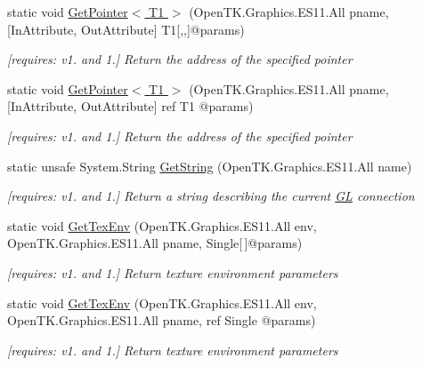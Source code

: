 \begin{DoxyCompactItemize}
static void \hyperlink{class_open_t_k_1_1_graphics_1_1_e_s11_1_1_g_l_a9da38128606214a602c546bffce73982}{Get\-Pointer$<$ T1 $>$} (Open\-T\-K.\-Graphics.\-E\-S11.\-All pname, \mbox{[}In\-Attribute, Out\-Attribute\mbox{]} T1\mbox{[},,\mbox{]}@params)
\begin{DoxyCompactList}\small\item\em \mbox{[}requires\-: v1. and 1.\mbox{]} Return the address of the specified pointer \end{DoxyCompactList}\item 
static void \hyperlink{class_open_t_k_1_1_graphics_1_1_e_s11_1_1_g_l_a3cc905378ff590fb6b6ba4b46355891b}{Get\-Pointer$<$ T1 $>$} (Open\-T\-K.\-Graphics.\-E\-S11.\-All pname, \mbox{[}In\-Attribute, Out\-Attribute\mbox{]} ref T1 @params)
\begin{DoxyCompactList}\small\item\em \mbox{[}requires\-: v1. and 1.\mbox{]} Return the address of the specified pointer \end{DoxyCompactList}\item 
static unsafe System.\-String \hyperlink{class_open_t_k_1_1_graphics_1_1_e_s11_1_1_g_l_a0abf324bb0633b3c653cf3a0b91361f6}{Get\-String} (Open\-T\-K.\-Graphics.\-E\-S11.\-All name)
\begin{DoxyCompactList}\small\item\em \mbox{[}requires\-: v1. and 1.\mbox{]} Return a string describing the current \hyperlink{class_open_t_k_1_1_graphics_1_1_e_s11_1_1_g_l}{G\-L} connection \end{DoxyCompactList}\item 
static void \hyperlink{class_open_t_k_1_1_graphics_1_1_e_s11_1_1_g_l_a9b7ddf178a46af571b1f2b7dca5b960a}{Get\-Tex\-Env} (Open\-T\-K.\-Graphics.\-E\-S11.\-All env, Open\-T\-K.\-Graphics.\-E\-S11.\-All pname, Single\mbox{[}$\,$\mbox{]}@params)
\begin{DoxyCompactList}\small\item\em \mbox{[}requires\-: v1. and 1.\mbox{]} Return texture environment parameters \end{DoxyCompactList}\item 
static void \hyperlink{class_open_t_k_1_1_graphics_1_1_e_s11_1_1_g_l_a932f46675a524ef1e1eb55748c14e83e}{Get\-Tex\-Env} (Open\-T\-K.\-Graphics.\-E\-S11.\-All env, Open\-T\-K.\-Graphics.\-E\-S11.\-All pname, ref Single @params)
\begin{DoxyCompactList}\small\item\em \mbox{[}requires\-: v1. and 1.\mbox{]} Return texture environment parameters \end{DoxyCompactList}\item 

\end{DoxyCompactItemize}
